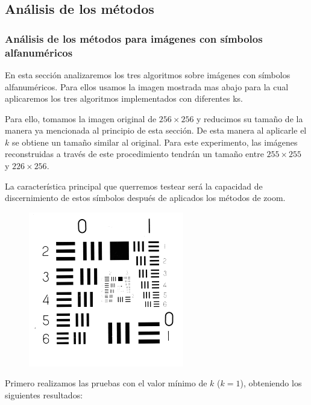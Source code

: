 \subsection{Análisis de los métodos}
\subsubsection{Análisis de los métodos para imágenes con símbolos alfanuméricos}
En esta sección analizaremos los tres algoritmos sobre imágenes con símbolos alfanuméricos. Para ellos usamos la imagen mostrada mas abajo para la cual aplicaremos los tres algoritmos implementados con diferentes ks.

Para ello, tomamos la imagen original de $256 \times 256$ y reducimos su tamaño de la manera ya mencionada al principio de esta sección. De esta manera al aplicarle el $k$ se obtiene un tamaño similar al original. Para este experimento, las imágenes reconstruidas a través de este procedimiento tendrán un tamaño entre $255 \times 255$ y $226 \times 256$.

La característica principal que querremos testear será la capacidad de discernimiento de estos símbolos después de aplicados los métodos de zoom.

\begin{figure}[H]
\centering
\includegraphics[scale=0.50]{fotos/alfanum/orig.png}
\end{figure}

Primero realizamos las pruebas con el valor mínimo de $k$ ($k=1$), obteniendo los siguientes resultados:


